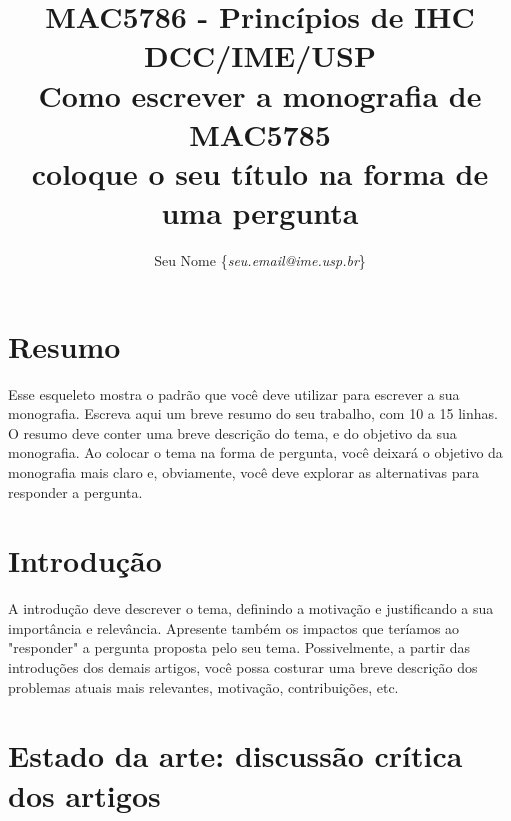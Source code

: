 \documentclass[12pt,A4]{article}
\begin{document}
\small{
    \title{
        \vspace{-2cm}
        {\small MAC5786 - Princípios de IHC \hfill DCC/IME/USP}
    \vspace{0.1in}\\
        Como escrever a monografia de MAC5785\\
        {\small coloque o seu título na forma de uma pergunta}
}
\vspace{-0.6in} 
    \author{Seu Nome  \{\textit{seu.email@ime.usp.br}\}
\vspace{-0.6in} 
}
    \date{}
\maketitle
}
\vspace {-0.3in}
\thispagestyle{empty}

\section{Resumo}

Esse esqueleto mostra o padrão que você deve utilizar para escrever a sua monografia.
Escreva aqui um breve resumo do seu trabalho, com 10 a 15 linhas.
O resumo deve conter uma breve descrição do tema, e do objetivo da sua
monografia.
Ao colocar o tema na forma de pergunta, você deixará o objetivo da monografia mais claro e, obviamente, você deve explorar as alternativas para responder a pergunta. 

\section{Introdução}
\label{sec:Introducao}

A introdução deve descrever o tema, definindo a motivação e justificando a sua importância e relevância. Apresente também os impactos que teríamos ao "responder" a pergunta proposta pelo seu tema. Possivelmente, a partir das
introduções dos demais artigos, você possa costurar uma breve
descrição dos problemas atuais mais relevantes, motivação, contribuições, etc.

\section{Estado da arte: discussão crítica dos artigos}
\label{sec:Artigos}
\end{document}
